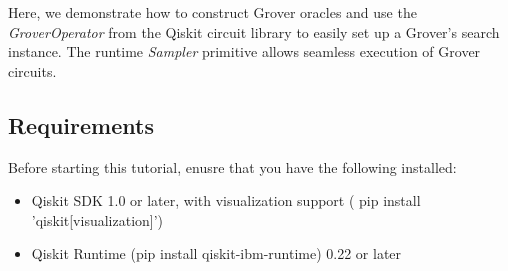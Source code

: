 \documentclass[12pt, oneside]{book}
\theoremstyle{definition}
\theoremstyle{definition}
\theoremstyle{remark}
\begin{document}
Here, we demonstrate how to construct Grover oracles and use the \textit{GroverOperator} from the Qiskit circuit library to easily set up a Grover's search instance. The runtime \textit{Sampler} primitive allows seamless execution of Grover circuits.

\subsection{Requirements}
Before starting this tutorial, enusre that you have the following installed:
\begin{itemize}
    \item Qiskit SDK 1.0 or later, with visualization support ( pip install 'qiskit[visualization]')
    \item Qiskit Runtime (pip install qiskit-ibm-runtime) 0.22 or later
\end{itemize}
\end{document}
